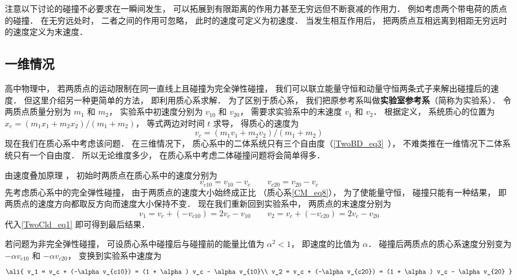 

注意以下讨论的碰撞不必要求在一瞬间发生， 可以拓展到有限距离的作用力甚至无穷远但不断衰减的作用力． 例如考虑两个带电荷的质点的碰撞． 在无穷远处时， 二者之间的作用可忽略， 此时的速度可定义为初速度． 当发生相互作用后， 把两质点互相远离到相距无穷远时的速度定义为末速度．

\subsection{一维情况}
高中物理中， 若两质点的运动限制在同一直线上且碰撞为完全弹性碰撞， 我们可以联立能量守恒和动量守恒两条式子来解出碰撞后的速度． 
但这里介绍另一种更简单的方法， 即利用质心系求解． 为了区别于质心系， 我们把原参考系叫做\textbf{实验室参考系}（简称为实验系）． 令两质点质量分别为 $m_1$ 和 $m_2$， 实验系中初速度分别为 $v_{10}$ 和 $v_{20}$， 需要求实验系中的末速度 $v_1$ 和 $v_2$． 根据定义， 系统质心的位置为 $x_c = (m_1 x_1 + m_2 x_2)/(m_1 + m_2)$， 等式两边对时间 $t$ 求导， 得质心的速度为
\begin{equation}\label{TwoCld_eq1}
v_c = (m_1 v_1 + m_2 v_2)/(m_1 + m_2)
\end{equation}
现在我们在质心系中考虑该问题． 在三维情况下， 质心系中的二体系统只有三个自由度（\autoref{TwoBD_eq3}~）， 不难类推在一维情况下二体系统只有一个自由度． 所以无论维度多少， 在质心系中考虑二体碰撞问题将会简单得多． 

由速度叠加原理%
， 初始时两质点在质心系中的速度分别为
\begin{equation}
v_{c10} = v_{10} - v_c \qquad v_{c20} = v_{20} - v_c
\end{equation}
先考虑质心系中的完全弹性碰撞， 由于两质点的速度大小始终成正比 （质心系\autoref{CM_eq8}）， 为了使能量守恒， 碰撞只能有一种结果， 即两质点的速度方向都取反方向而速度大小保持不变． 现在我们重新回到实验系中， 两质点的末速度分别为
\begin{equation}
v_1 = v_c + (-v_{c10}) = 2v_c - v_{10}  \qquad v_2 = v_c + (-v_{c20}) = 2v_c - v_{20}
\end{equation}
代入\autoref{TwoCld_eq1} 即可得到最后结果．

若问题为非完全弹性碰撞， 可设质心系中碰撞后与碰撞前的能量比值为 $\alpha^2 < 1$， 即速度的比值为 $\alpha$． 碰撞后两质点的质心系速度分别变为 $-\alpha v_{c10}$ 和 $-\alpha v_{c20}$， 变换到实验系中速度为
\begin{equation}\ali{
v_1 = v_c + (-\alpha v_{c10}) = (1 + \alpha) v_c - \alpha v_{10}\\
v_2 = v_c + (-\alpha v_{c20}) = (1 + \alpha) v_c - \alpha v_{20}
}\end{equation}

